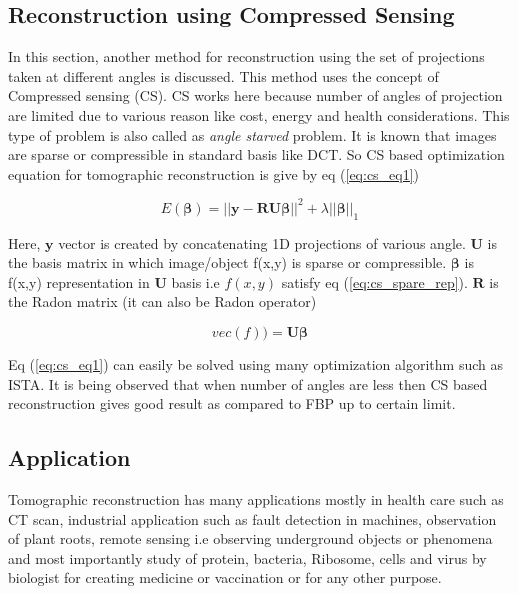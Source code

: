\documentclass{report}
\begin{document}
\subsection{Reconstruction using Compressed Sensing}\label{subsec:reconst_cs}
In this section, another method for reconstruction using the set of projections taken at different angles is discussed. This method uses the concept of Compressed sensing (CS). CS works here because number of angles of projection are limited due to various reason like cost, energy and health considerations. This type of problem is also called as \textit{angle starved} problem. It is known that images are sparse or compressible in standard basis like DCT. So CS based optimization equation for tomographic reconstruction is give by eq (\ref{eq:cs_eq1})

\begin{equation}\label{eq:cs_eq1}
E(\boldsymbol{\beta}) =  ||\boldsymbol{y - RU\beta}||^2 +\lambda||\boldsymbol{\beta}||_1
\end{equation}

\noindent
Here, $\boldsymbol{y}$ vector is created by concatenating 1D projections of various angle. $\boldsymbol{U}$ is the basis matrix in which image/object f(x,y) is sparse or compressible. $\boldsymbol{\beta}$ is f(x,y) representation in $\boldsymbol{U}$ basis i.e ${f(x,y)}$ satisfy eq (\ref{eq:cs_spare_rep}). $\boldsymbol{R}$ is the Radon matrix (it can also be  Radon operator)

\begin{equation}\label{eq:cs_spare_rep}
vec(f)) =  \boldsymbol{U\beta}
\end{equation}

\noindent
Eq (\ref{eq:cs_eq1}) can easily be solved using many optimization algorithm such as ISTA.  It is being observed that when number of angles are less then CS based reconstruction gives good result as compared to FBP up to certain limit.

\subsection{Application}
Tomographic reconstruction has many applications mostly in health care such as CT scan, industrial application such as fault detection in machines, observation of plant roots, remote sensing i.e observing underground objects or phenomena and most importantly study of protein, bacteria, Ribosome, cells and virus by biologist for creating medicine or vaccination or for any other purpose.
\end{document}
